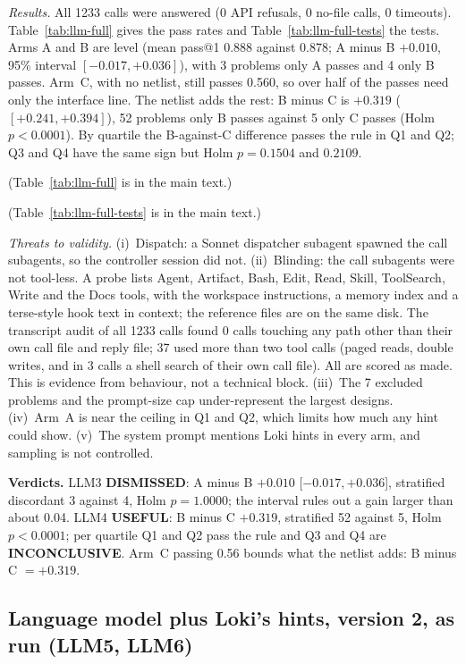 \documentclass[conference]{IEEEtran}
\newcommand{\verdict}[1]{\textbf{\textsc{#1}}}
\newcommand{\hev}[1]{\par\smallskip\noindent\textbf{#1}}
\begin{document}
\emph{Results.} All 1233 calls were answered (0 API refusals, 0 no-file calls, 0 timeouts). Table~\ref{tab:llm-full}
gives the pass rates and Table~\ref{tab:llm-full-tests} the tests. Arms A and B are level
(mean pass@1 0.888 against 0.878; A minus B $+0.010$, 95\% interval $[-0.017,+0.036]$), with 3 problems
only A passes and 4 only B passes. Arm~C, with no netlist, still passes 0.560, so over half of the passes need only the interface line. The
netlist adds the rest: B minus C is $+0.319$ ($[+0.241,+0.394]$), 52 problems only B passes against 5 only C passes
(Holm $p<0.0001$). By quartile the B-against-C difference passes the rule in Q1 and Q2; Q3 and Q4 have the same sign but
Holm $p=0.1504$ and $0.2109$.

(Table~\ref{tab:llm-full} is in the main text.)

(Table~\ref{tab:llm-full-tests} is in the main text.)

\emph{Threats to validity.} (i)~Dispatch: a Sonnet dispatcher subagent spawned the call subagents, so the controller
session did not. (ii)~Blinding: the call subagents were not tool-less. A probe lists Agent, Artifact, Bash, Edit, Read, Skill, ToolSearch, Write
and the Docs tools, with the workspace instructions, a memory index and a terse-style hook text in context; the reference files are on
the same disk. The transcript audit of all 1233 calls found 0 calls touching any path other than their own call file and reply
file; 37 used more than two tool calls (paged reads, double writes, and in 3 calls a shell search of their own call file). All are scored as made. This
is evidence from behaviour, not a technical block. (iii)~The 7 excluded problems and the prompt-size cap
under-represent the largest designs. (iv)~Arm~A is near the ceiling in Q1 and Q2, which limits how much any hint could show.
(v)~The system prompt mentions Loki hints in every arm, and sampling is not controlled.

\hev{Verdicts.} LLM3 \verdict{DISMISSED}: A minus B $+0.010$ [$-0.017,+0.036$], stratified discordant 3 against 4, Holm $p=1.0000$; the
interval rules out a gain larger than about 0.04. LLM4 \verdict{USEFUL}: B minus C $+0.319$, stratified 52 against 5, Holm $p<0.0001$; per quartile Q1 and Q2
pass the rule and Q3 and Q4 are \verdict{INCONCLUSIVE}. Arm~C passing 0.56 bounds what the netlist adds: B minus C $=+0.319$.

\subsection{Language model plus Loki's hints, version 2, as run (LLM5, LLM6)}
\label{sec:llm-hints2-rec}
\end{document}
